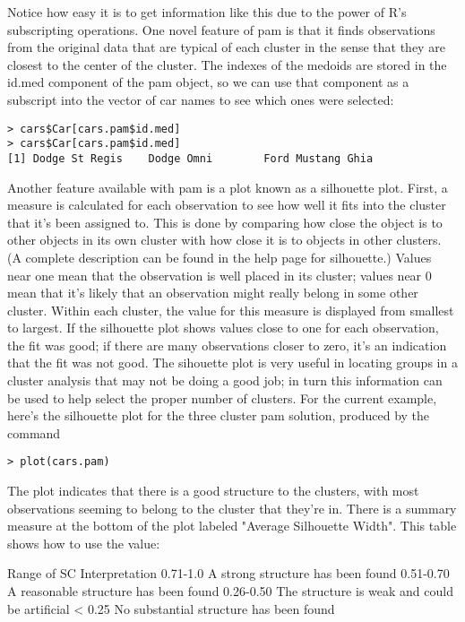 {Notice how easy it is to get information like this due to the power of R's subscripting operations.
One novel feature of pam is that it finds observations from the original data that are typical of each cluster in the sense that they are closest to the center of the cluster. The indexes of the medoids are stored in the id.med component of the pam object, so we can use that component as a subscript into the vector of car names to see which ones were selected:
\begin{framed}
\begin{verbatim}
> cars$Car[cars.pam$id.med]
> cars$Car[cars.pam$id.med]
[1] Dodge St Regis    Dodge Omni        Ford Mustang Ghia
\end{verbatim}
\end{framed}
Another feature available with pam is a plot known as a silhouette plot. First, a measure is calculated for each observation to see how well it fits into the cluster that it's been assigned to. This is done by comparing how close the object is to other objects in its own cluster with how close it is to objects in other clusters. (A complete description can be found in the help page for silhouette.) Values near one mean that the observation is well placed in its cluster; values near 0 mean that it's likely that an observation might really belong in some other cluster. Within each cluster, the value for this measure is displayed from smallest to largest. If the silhouette plot shows values close to one for each observation, the fit was good; if there are many observations closer to zero, it's an indication that the fit was not good. The sihouette plot is very useful in locating groups in a cluster analysis that may not be doing a good job; in turn this information can be used to help select the proper number of clusters. For the current example, here's the silhouette plot for the three cluster pam solution, produced by the command
\begin{framed}
\begin{verbatim}
> plot(cars.pam)
\end{verbatim}
\end{framed}

The plot indicates that there is a good structure to the clusters, with most observations seeming to belong to the cluster that they're in. There is a summary measure at the bottom of the plot labeled "Average Silhouette Width". This table shows how to use the value:

Range of SC	Interpretation
0.71-1.0	A strong structure has been found
0.51-0.70	A reasonable structure has been found
0.26-0.50	The structure is weak and could be artificial
< 0.25	No substantial structure has been found

}
